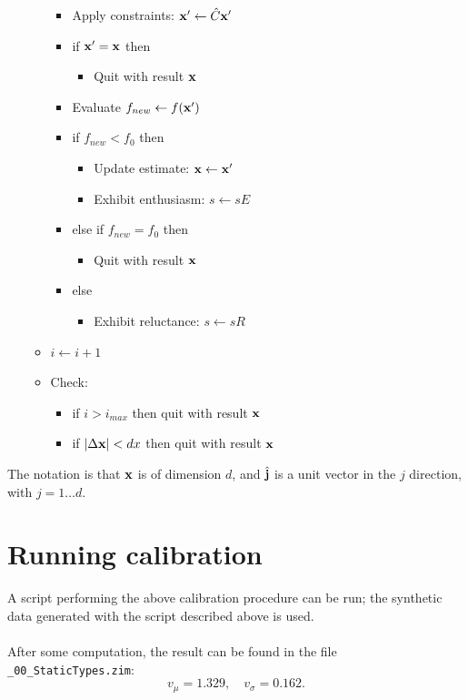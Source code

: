 \begin{itemize}
\begin{itemize}
\begin{itemize}
    \item[] Apply constraints: ${\bf x}' \leftarrow \hat{C} {\bf x}'$
    \item[] if ${\bf x}' = {\bf x}$ then
      \begin{itemize}
      \item[] Quit with result ${\bf x}$
      \end{itemize}
    \item[] Evaluate $f_{new} \leftarrow f({\bf x}')$
    \item[] if $f_{new} < f_0$ then
      \begin{itemize}
      \item[] Update estimate: ${\bf x} \leftarrow {\bf x}'$
      \item[] Exhibit enthusiasm: $ s \leftarrow sE$
      \end{itemize}
    \item[] else if $f_{new} = f_0$ then
      \begin{itemize}
      \item[] Quit with result ${\bf x}$
      \end{itemize}
    \item[] else
      \begin{itemize}
      \item[] Exhibit reluctance: $ s \leftarrow sR$
      \end{itemize}
    \end{itemize}
  \item[] $i \leftarrow i+1$
  \item[] Check:
    \begin{itemize}
    \item[] if $i>i_{max}$ then quit with result ${\bf x}$
    \item[] if $|\Delta{\bf x}| < dx$ then quit with result ${\bf x}$
    \end{itemize}
  \end{itemize}
\end{itemize}
The notation is that ${\bf x}$ is of dimension $d$, and $\hat {\bf j}$ is a unit vector in the $j$ direction, with $j=1\dots d$.

\section{Running calibration}

A script performing the above calibration procedure can be run; the synthetic data generated
with the script described above is used.\\
 \\
After some computation, the result can be found in the file {\tt \_00\_StaticTypes.zim}:
\[ %
  v_\mu = 1.329,  \quad v_\sigma = 0.162
.\]

